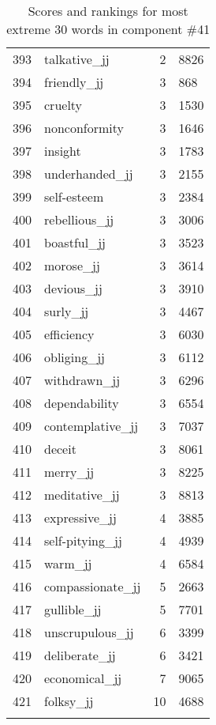 \begin{longtable}[!htbp]{| rlr@{.}l |}
    393 & talkative\_jj & 2 & 8826 \\
    394 & friendly\_jj & 3 & 868 \\
    395 & cruelty & 3 & 1530 \\
    396 & nonconformity & 3 & 1646 \\
    397 & insight & 3 & 1783 \\
    398 & underhanded\_jj & 3 & 2155 \\
    399 & self-esteem & 3 & 2384 \\
    400 & rebellious\_jj & 3 & 3006 \\
    401 & boastful\_jj & 3 & 3523 \\
    402 & morose\_jj & 3 & 3614 \\
    403 & devious\_jj & 3 & 3910 \\
    404 & surly\_jj & 3 & 4467 \\
    405 & efficiency & 3 & 6030 \\
    406 & obliging\_jj & 3 & 6112 \\
    407 & withdrawn\_jj & 3 & 6296 \\
    408 & dependability & 3 & 6554 \\
    409 & contemplative\_jj & 3 & 7037 \\
    410 & deceit & 3 & 8061 \\
    411 & merry\_jj & 3 & 8225 \\
    412 & meditative\_jj & 3 & 8813 \\
    413 & expressive\_jj & 4 & 3885 \\
    414 & self-pitying\_jj & 4 & 4939 \\
    415 & warm\_jj & 4 & 6584 \\
    416 & compassionate\_jj & 5 & 2663 \\
    417 & gullible\_jj & 5 & 7701 \\
    418 & unscrupulous\_jj & 6 & 3399 \\
    419 & deliberate\_jj & 6 & 3421 \\
    420 & economical\_jj & 7 & 9065 \\
    421 & folksy\_jj & 10 & 4688 \\
    \hline
    \caption{Scores and rankings for most extreme 30 words in component \#41} \\
\end{longtable}
